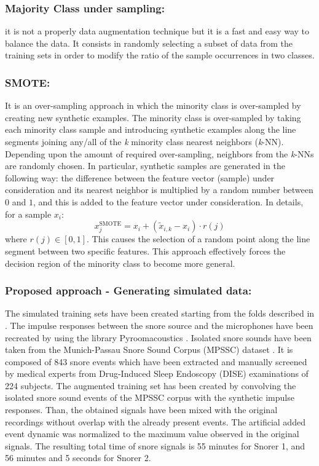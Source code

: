\subsubsection{Majority Class under sampling:} it is not a properly data augmentation technique but it is a fast and easy way to balance the data. It consists in randomly selecting a subset of data from the training sets in order to modify the ratio of the sample occurrences in two classes.

\subsubsection{SMOTE:} It is an over-sampling approach in which the minority class is over-sampled by creating new synthetic examples. The minority class is over-sampled by taking each minority class sample and introducing synthetic examples along the line segments joining any/all of the \emph{k} minority class nearest neighbors (\emph{k}-NN). Depending upon the amount of required over-sampling, neighbors from the \emph{k}-NNs are randomly chosen. In particular, synthetic samples are generated in the following way: the difference between the feature vector (sample) under consideration and its nearest neighbor is multiplied by a random number between $0$ and $1$, and this is added to the feature vector under consideration. In details, for a sample $x_{i}$:
\begin{equation}
x_{j}^{\text{SMOTE}} = x_{i} + (\tilde{x}_{i,k} - x_{i}) \cdot r(j)
\end{equation}
where $r(j) \in [0,1]$.
This causes the selection of a random point along the line segment between two specific features. This approach effectively forces the decision region of the minority class to become more general. 

\subsubsection{Proposed approach - Generating simulated data:} The simulated training sets have been created starting from the folds described in .
The impulse responses between the snore source and the microphones have been recreated by using the library Pyroomacoustics \cite{Scheibler2018}.
Isolated snore sounds have been taken from the Munich-Passau Snore Sound Corpus (MPSSC) dataset \cite{ComParE2017}. It is composed of 843 snore events which have been extracted and manually screened by medical experts from Drug-Induced Sleep Endoscopy (DISE) examinations of 224 subjects.
The augmented training set has been created by convolving the isolated snore sound events of the MPSSC corpus with the synthetic impulse responses. Than, the obtained signals have been mixed with the original recordings without overlap with the already present events. The artificial added event dynamic was normalized to the maximum value observed in the original signals. The resulting total time of snore signals is 55 minutes for Snorer 1, and 56 minutes and 5 seconds for Snorer 2.

